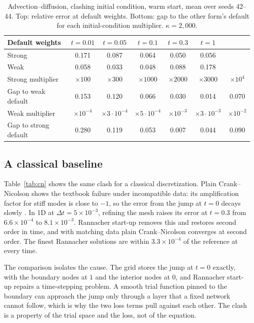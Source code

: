 \documentclass[a4paper,fleqn]{cas-sc}
\begin{document}
\begin{table}[htbp]
\centering
\caption{Advection--diffusion, clashing initial condition, warm start, mean over seeds 42--44. Top: relative error at
default weights. Bottom: gap to the other form's default for each initial-condition multiplier. $\kappa=2{,}000$.}
\label{tab:adv}
\small
\setlength{\tabcolsep}{3pt}
\begin{tabular}{lcccccc}
\toprule
Default weights & $t=0.01$ & $t=0.05$ & $t=0.1$ & $t=0.3$ & $t=1$ & \\
\midrule
Strong & 0.171 & 0.087 & 0.064 & 0.050 & 0.056 & \\
Weak & 0.058 & 0.033 & 0.048 & 0.088 & 0.178 & \\
\midrule
Strong multiplier & $\times100$ & $\times300$ & $\times1000$ & $\times2000$ & $\times3000$ & $\times10^4$ \\
Gap to weak default & 0.153 & 0.120 & 0.066 & 0.030 & 0.014 & 0.070 \\
\midrule
Weak multiplier & $\times10^{-4}$ & $\times3{\cdot}10^{-4}$ & $\times5{\cdot}10^{-4}$ & $\times10^{-3}$ & $\times3{\cdot}10^{-3}$ & $\times10^{-2}$ \\
Gap to strong default & 0.280 & 0.119 & 0.053 & 0.007 & 0.044 & 0.090 \\
\bottomrule
\end{tabular}
\end{table}

\subsection{A classical baseline}
\label{sec:baseline}

Table~\ref{tab:cn} shows the same clash for a classical discretization. Plain Crank--Nicolson shows the textbook failure
under incompatible data: its amplification factor for stiff modes is close to $-1$, so the error from the jump at $t=0$
decays slowly \cite{luskin1982}. In 1D at $\Delta t=5\times10^{-3}$, refining the mesh raises its error at $t=0.3$ from
$6.6\times10^{-4}$ to $8.1\times10^{-3}$. Rannacher start-up \cite{rannacher1984} removes this and restores second order in
time, and with matching data plain Crank--Nicolson converges at second order. The finest Rannacher solutions are within
$3.3\times10^{-4}$ of the reference at every time.

The comparison isolates the cause. The grid stores the jump at $t=0$ exactly, with the boundary nodes at $1$ and the
interior nodes at $0$, and Rannacher start-up repairs a time-stepping problem. A smooth trial function pinned to the
boundary can approach the jump only through a layer that a fixed network cannot follow, which is why the two loss
terms pull against each other. The clash is a property of the
trial space and the loss, not of the equation.
\end{document}
